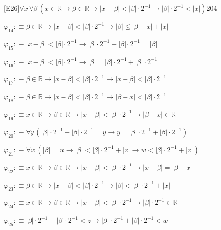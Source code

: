 \begin{fullproof}{[E26]}{$\forall x\,\forall \beta\,(x \in \mathbb{R} \to \beta \in \mathbb{R} \to \lvert x - \beta \rvert < \lvert \beta \rvert \cdot 2^{-1} \to \lvert \beta \rvert \cdot 2^{-1} < \lvert x \rvert)$}{204}
\begin{abbrevlist}
\item $\varphi_{14} :\equiv \beta \in \mathbb{R} \to \lvert x - \beta \rvert < \lvert \beta \rvert \cdot 2^{-1} \to \lvert \beta \rvert \leq \lvert \beta - x \rvert + \lvert x \rvert$
\item $\varphi_{15} :\equiv \lvert x - \beta \rvert < \lvert \beta \rvert \cdot 2^{-1} \to \lvert \beta \rvert \cdot 2^{-1} + \lvert \beta \rvert \cdot 2^{-1} = \lvert \beta \rvert$
\item $\varphi_{16} :\equiv \lvert x - \beta \rvert < \lvert \beta \rvert \cdot 2^{-1} \to \lvert \beta \rvert = \lvert \beta \rvert \cdot 2^{-1} + \lvert \beta \rvert \cdot 2^{-1}$
\item $\varphi_{17} :\equiv \beta \in \mathbb{R} \to \lvert x - \beta \rvert < \lvert \beta \rvert \cdot 2^{-1} \to \lvert x - \beta \rvert < \lvert \beta \rvert \cdot 2^{-1}$
\item $\varphi_{18} :\equiv \beta \in \mathbb{R} \to \lvert x - \beta \rvert < \lvert \beta \rvert \cdot 2^{-1} \to \lvert \beta - x \rvert < \lvert \beta \rvert \cdot 2^{-1}$
\item $\varphi_{19} :\equiv x \in \mathbb{R} \to \beta \in \mathbb{R} \to \lvert x - \beta \rvert < \lvert \beta \rvert \cdot 2^{-1} \to \lvert \beta - x \rvert \in \mathbb{R}$
\item $\varphi_{20} :\equiv \forall y\,(\lvert \beta \rvert \cdot 2^{-1} + \lvert \beta \rvert \cdot 2^{-1} = y \to y = \lvert \beta \rvert \cdot 2^{-1} + \lvert \beta \rvert \cdot 2^{-1})$
\item $\varphi_{21} :\equiv \forall w\,(\lvert \beta \rvert = w \to \lvert \beta \rvert < \lvert \beta \rvert \cdot 2^{-1} + \lvert x \rvert \to w < \lvert \beta \rvert \cdot 2^{-1} + \lvert x \rvert)$
\item $\varphi_{22} :\equiv x \in \mathbb{R} \to \beta \in \mathbb{R} \to \lvert x - \beta \rvert < \lvert \beta \rvert \cdot 2^{-1} \to \lvert x - \beta \rvert = \lvert \beta - x \rvert$
\item $\varphi_{23} :\equiv \beta \in \mathbb{R} \to \lvert x - \beta \rvert < \lvert \beta \rvert \cdot 2^{-1} \to \lvert \beta \rvert < \lvert \beta \rvert \cdot 2^{-1} + \lvert x \rvert$
\item $\varphi_{24} :\equiv x \in \mathbb{R} \to \beta \in \mathbb{R} \to \lvert x - \beta \rvert < \lvert \beta \rvert \cdot 2^{-1} \to \lvert \beta \rvert \cdot 2^{-1} \in \mathbb{R}$
\item $\varphi_{25} :\equiv \lvert \beta \rvert \cdot 2^{-1} + \lvert \beta \rvert \cdot 2^{-1} < z \to \lvert \beta \rvert \cdot 2^{-1} + \lvert \beta \rvert \cdot 2^{-1} < w$

\end{abbrevlist}
\end{fullproof}
